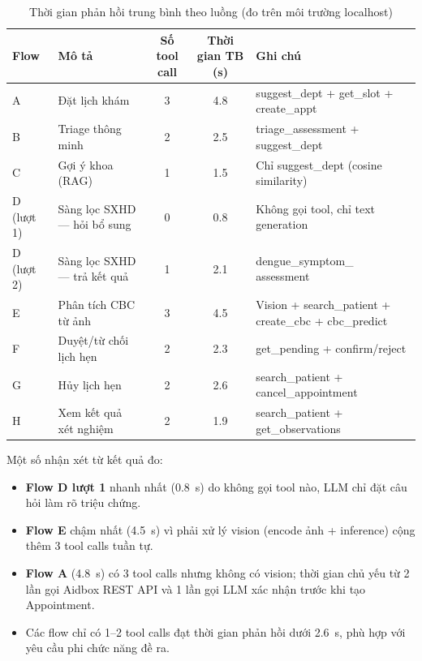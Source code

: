 \documentclass[a4paper,13pt,3p,oneside]{report}
\theoremstyle{definition}
\theoremstyle{remark}
\theoremstyle{definition}
\begin{document}
\begin{table}[H]
\centering
\small
\begin{tabular}{|l|p{3.2cm}|c|c|p{4.8cm}|}
\hline
\textbf{Flow} & \textbf{Mô tả} & \textbf{Số tool call} & \textbf{Thời gian TB (s)} & \textbf{Ghi chú} \\
\hline
A & Đặt lịch khám & 3 & 4.8 & suggest\_dept + get\_slot + create\_appt \\
\hline
B & Triage thông minh & 2 & 2.5 & triage\_assessment + suggest\_dept \\
\hline
C & Gợi ý khoa (RAG) & 1 & 1.5 & Chỉ suggest\_dept (cosine similarity) \\
\hline
D (lượt 1) & Sàng lọc SXHD --- hỏi bổ sung & 0 & 0.8 & Không gọi tool, chỉ text generation \\
\hline
D (lượt 2) & Sàng lọc SXHD --- trả kết quả & 1 & 2.1 & dengue\_symptom\_ assessment \\
\hline
E & Phân tích CBC từ ảnh & 3 & 4.5 & Vision + search\_patient \newline + create\_cbc + cbc\_predict \\
\hline
F & Duyệt/từ chối lịch hẹn & 2 & 2.3 & get\_pending + confirm/reject \\
\hline
G & Hủy lịch hẹn & 2 & 2.6 & search\_patient \newline + cancel\_appointment \\
\hline
H & Xem kết quả xét nghiệm & 2 & 1.9 & search\_patient + get\_observations \\
\hline
\end{tabular}
\caption{Thời gian phản hồi trung bình theo luồng (đo trên môi trường localhost)}
\label{tab:perf}
\end{table}

Một số nhận xét từ kết quả đo:
\begin{itemize}
  \item \textbf{Flow D lượt 1} nhanh nhất (0.8~s) do không gọi tool nào, LLM chỉ đặt câu hỏi làm rõ triệu chứng.
  \item \textbf{Flow E} chậm nhất (4.5~s) vì phải xử lý vision (encode ảnh + inference) cộng thêm 3 tool calls tuần tự.
  \item \textbf{Flow A} (4.8~s) có 3 tool calls nhưng không có vision; thời gian chủ yếu từ 2 lần gọi Aidbox REST API và 1 lần gọi LLM xác nhận trước khi tạo Appointment.
  \item Các flow chỉ có 1--2 tool calls đạt thời gian phản hồi dưới 2.6~s, phù hợp với yêu cầu phi chức năng đề ra.
\end{itemize}
\end{document}
